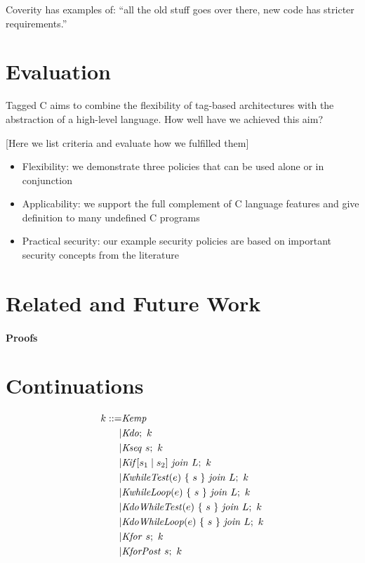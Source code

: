 \documentclass[acmsmall,review,anonymous]{acmart}\settopmatter{printfolios=true,printccs=false,printacmref=false}
\begin{document}
Coverity has examples of:
``all the old stuff goes over there, new code has stricter requirements.''

\section{Evaluation}
\label{sec:evaluation}

Tagged C aims to combine the flexibility of tag-based architectures with the abstraction
of a high-level language. How well have we achieved this aim?

[Here we list criteria and evaluate how we fulfilled them]

\begin{itemize}
\item Flexibility: we demonstrate three policies that can be used alone or in conjunction
\item Applicability: we support the full complement of C language features and give definition
  to many undefined C programs
\item Practical security: our example security policies are based on important security concepts
  from the literature
\end{itemize}

\section{Related and Future Work}
\label{sec:relwork}

\paragraph{Proofs}



\appendix

\section{Continuations}
\label{app:continuations}

\[\begin{split}
k ::= & \mathit{Kemp} \\
| & \mathit{Kdo};~ k \\
| & \mathit{Kseq} ~ s; ~ k \\
| & \mathit{Kif}[s_1 \mid s_2] ~ \mathit{join} ~ L; ~ k \\
| & \mathit{KwhileTest}(e) ~ \{ ~ s ~ \} ~ \mathit{join} ~ L; ~ k \\
| & \mathit{KwhileLoop}(e) ~ \{ ~ s ~ \} ~ \mathit{join} ~ L; ~ k \\
| & \mathit{KdoWhileTest}(e) ~ \{ ~ s ~ \} ~ \mathit{join} ~ L; ~ k \\
| & \mathit{KdoWhileLoop}(e) ~ \{ ~ s ~ \} ~ \mathit{join} ~ L; ~ k \\
| & \mathit{Kfor} ~ s; ~ k \\
| & \mathit{KforPost} ~ s; ~ k \\
\end{split}\]
\end{document}
